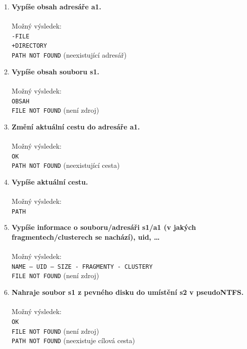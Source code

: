 \documentclass[
11pt,
a4paper,
pdftex,
czech,
titlepage
]{report}
\begin{document}
\begin{enumerate}[label=\textbf{\arabic*}.]
\item \textbf{Vypíše obsah adresáře a1.}\\[0,2cm]
\noindent {}\\[0.5\baselineskip]
Možný výsledek:\\
\texttt{-FILE}\\
\texttt{+DIRECTORY}\\
\texttt{PATH NOT FOUND} (neexistující adresář)\\

\item \textbf{Vypíše obsah souboru s1.}\\[0,2cm]
\noindent {}\\[0.5\baselineskip]
Možný výsledek:\\
\texttt{OBSAH}\\
\texttt{FILE NOT FOUND} (není zdroj)\\

\item \textbf{Změní aktuální cestu do adresáře a1.}\\[0,2cm]
\noindent {}\\[0.5\baselineskip]
Možný výsledek:\\
\texttt{OK}\\
\texttt{PATH NOT FOUND} (neexistující cesta)\\

\item \textbf{Vypíše aktuální cestu.}\\[0,2cm]
\noindent {}\\[0.5\baselineskip]
Možný výsledek:\\
\texttt{PATH}\\

\item \textbf{Vypíše informace o souboru/adresáři s1/a1 (v jakých fragmentech/clusterech se nachází), uid, …}\\[0,2cm]
\noindent {}\\[0.5\baselineskip]
Možný výsledek:\\
\texttt{NAME – UID – SIZE - FRAGMENTY - CLUSTERY}\\
\texttt{FILE NOT FOUND} (není zdroj)\\

\item \textbf{Nahraje soubor s1 z pevného disku do umístění s2 v pseudoNTFS.}\\[0,2cm]
\noindent {}\\[0.5\baselineskip]
Možný výsledek:\\
\texttt{OK}\\
\texttt{FILE NOT FOUND} (není zdroj)\\
\texttt{PATH NOT FOUND} (neexistuje cílová cesta)\\


\end{enumerate}
\end{document}
